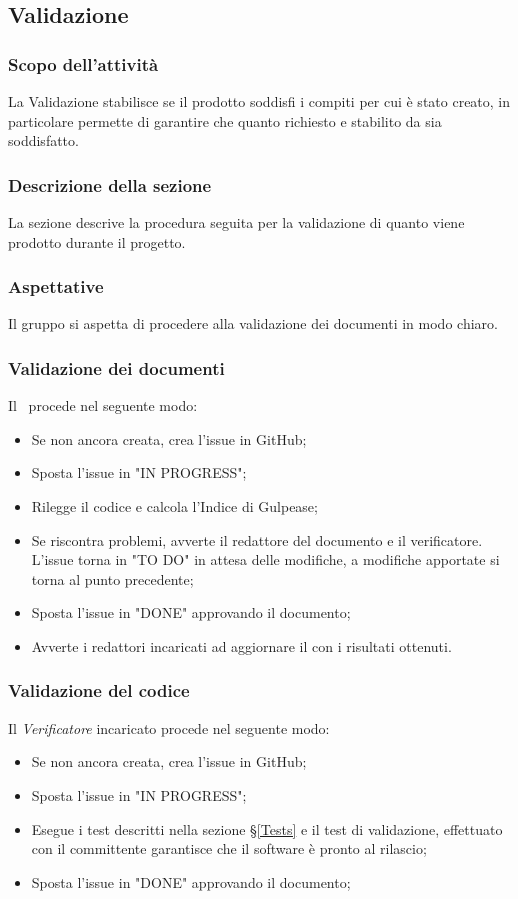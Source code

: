 \subsection{Validazione}\label{PSup_Validazione}
\subsubsection{Scopo dell'attività}\label{PSup_Validazione_Scopo}
La Validazione stabilisce se il prodotto soddisfi i compiti per cui è stato creato, in particolare permette di garantire che quanto richiesto e stabilito da \Proponente sia soddisfatto.
\subsubsection{Descrizione della sezione} 
La sezione descrive la procedura seguita per la validazione di quanto viene prodotto durante il progetto.
\subsubsection{Aspettative}
Il gruppo si aspetta di procedere alla validazione dei documenti in modo chiaro. 

\subsubsection{Validazione dei documenti}\label{ValidazioneDoc}
Il \Responsabile\ procede nel seguente modo:
\begin{itemize}
	\item Se non ancora creata, crea l'issue in GitHub;
	\item Sposta l'issue in "IN PROGRESS";
	\item Rilegge il codice e calcola l'Indice di Gulpease;
	\item Se riscontra problemi, avverte il redattore del documento e il verificatore. L'issue torna in "TO DO" in attesa delle modifiche, a modifiche apportate si torna al punto precedente;
	\item Sposta l'issue in "DONE" approvando il documento;
	\item Avverte i redattori incaricati ad aggiornare il \PdQv{} con i risultati ottenuti.
\end{itemize}

\subsubsection{Validazione del codice}\label{ValidazioneCodice}
Il \textit{Verificatore} incaricato procede nel seguente modo:
\begin{itemize}
	\item Se non ancora creata, crea l'issue in GitHub;
	\item Sposta l'issue in "IN PROGRESS";
	\item Esegue i test descritti nella sezione \S\ref{Tests} e il test di validazione, effettuato con il committente garantisce che il software è pronto al rilascio;
	\item Sposta l'issue in "DONE" approvando il documento;
\end{itemize}


